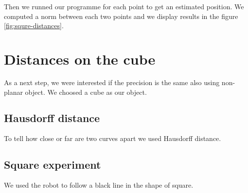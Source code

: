 Then we runned our programme for each point to get an estimated position. We
computed a norm between each two points and we display results in the figure
\ref{fig:squre-distances}.

\section{Distances on the cube}
As a next step, we were interested if the precision is the same also using
non-planar object. We choosed a cube as our object.

\subsection{Hausdorff distance} To tell how close or far are two
curves apart we used Hausdorff distance.

\subsection{Square experiment} We used the robot to follow a black line in the shape of
square.

